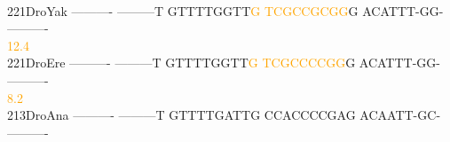 \documentclass[11pt,twoside,reqno,a4paper]{article}
\begin{document}
{\hspace*{4\charwidth}\hspace*{7\charwidth}\hspace*{1\charwidth}\hspace*{1\charwidth}\hspace*{1\charwidth}\hspace*{1\charwidth}\hspace*{1\charwidth}\hspace*{1\charwidth}\\
221\hspace*{1\charwidth}DroYak	----------	---------T	GTTTTGGTT\textcolor{orange}{G}	\textcolor{orange}{T}\textcolor{orange}{C}\textcolor{orange}{G}\textcolor{orange}{C}\textcolor{orange}{C}\textcolor{orange}{G}\textcolor{orange}{C}\textcolor{orange}{G}\textcolor{orange}{G}G	ACATTT-GG-	----------	\\
\hspace*{4\charwidth}\hspace*{7\charwidth}\hspace*{1\charwidth}\hspace*{1\charwidth}\hspace*{29\charwidth}\textcolor{orange}{12.4}\hspace*{1\charwidth}\hspace*{1\charwidth}\hspace*{1\charwidth}\hspace*{1\charwidth}\\
221\hspace*{1\charwidth}DroEre	----------	---------T	GTTTTGGTT\textcolor{orange}{G}	\textcolor{orange}{T}\textcolor{orange}{C}\textcolor{orange}{G}\textcolor{orange}{C}\textcolor{orange}{C}\textcolor{orange}{C}\textcolor{orange}{C}\textcolor{orange}{G}\textcolor{orange}{G}G	ACATTT-GG-	----------	\\
\hspace*{4\charwidth}\hspace*{7\charwidth}\hspace*{1\charwidth}\hspace*{1\charwidth}\hspace*{29\charwidth}\textcolor{orange}{8.2}\hspace*{1\charwidth}\hspace*{1\charwidth}\hspace*{1\charwidth}\hspace*{1\charwidth}\\
213\hspace*{1\charwidth}DroAna	----------	---------T	GTTTTGATTG	CCACCCCGAG	ACAATT-GC-	----------	\\
}
\end{document}
